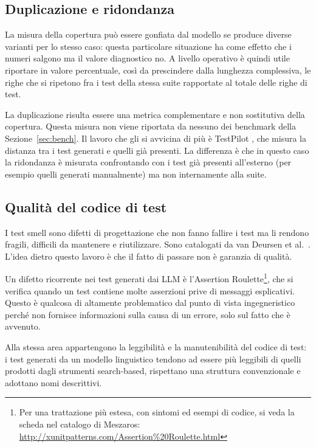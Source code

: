 \subsection{Duplicazione e ridondanza}
La misura della copertura può essere gonfiata dal modello se produce diverse varianti per lo stesso caso: questa particolare situazione ha come effetto che i numeri salgono ma il valore diagnostico no.
A livello operativo è quindi utile riportare in valore percentuale, così da prescindere dalla lunghezza complessiva, le righe che si ripetono fra i test della stessa suite rapportate al totale delle righe di test.

La duplicazione risulta essere una metrica complementare e non sostitutiva della copertura. Questa misura non viene riportata da nessuno dei benchmark della Sezione~\ref{sec:bench}. Il lavoro che gli si avvicina di più è TestPilot \cite{schaefer2024testpilot}, che misura la distanza tra i test generati e quelli già presenti. La differenza è che in questo caso la ridondanza è misurata confrontando con i test già presenti all'esterno (per esempio quelli generati manualmente) ma non internamente alla suite.


\subsection{Qualità del codice di test}
I test smell sono difetti di progettazione che non fanno fallire i test ma li rendono fragili, difficili da mantenere e riutilizzare. Sono catalogati da van Deursen et al.~\cite{vandeursen2001testsmells}. L'idea dietro questo lavoro è che il fatto di passare non è garanzia di qualità.

Un difetto ricorrente nei test generati dai LLM è l'Assertion Roulette\footnote{Per una trattazione più estesa, con sintomi ed esempi di codice, si veda la scheda nel catalogo di Meszaros:
\url{http://xunitpatterns.com/Assertion\%20Roulette.html}}, che si verifica quando un test contiene molte asserzioni prive di messaggi esplicativi. Questo è qualcosa di altamente problematico dal punto di vista ingegneristico perché non fornisce informazioni sulla causa di un errore, solo sul fatto che è avvenuto.

Alla stessa area appartengono la leggibilità e la manutenibilità del codice di test: i test generati da un modello linguistico tendono ad essere più leggibili di quelli prodotti dagli strumenti search-based, rispettano una struttura convenzionale e adottano nomi descrittivi.

